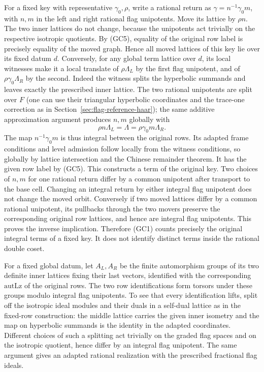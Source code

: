 For a fixed key with representative \(\gamma_0,\rho\), write a
rational return as \(\gamma=n^{-1}\gamma_0m\), with \(n,m\) in
the left and right rational flag unipotents. Move its lattice
by \(\rho n\). The two inner lattices do not change, because
the unipotents act trivially on the respective isotropic
quotients. By (GC5), equality of the original row label is
precisely equality of the moved graph. Hence all moved
lattices of this key lie over its fixed datum \(d\).
Conversely, for any global term lattice over \(d\), its local
witnesses make it a local translate of \(\rho\Lambda_L\) by
the first flag unipotent, and of
\(\rho\gamma_0\Lambda_R\) by the second. Indeed the witness
splits the hyperbolic summands and leaves exactly the
prescribed inner lattice. The two rational unipotents are
split over \(F\) (one can use their triangular hyperbolic
coordinates and the trace-one correction as in
Section~\ref{sec:flag-reference-haar}); the same additive
approximation argument produces \(n,m\) globally with
\[
       \rho n\Lambda_L=\Lambda=\rho\gamma_0m\Lambda_R.
\]
The map \(n^{-1}\gamma_0m\) is thus integral between the original
rows. Its adapted frame conditions and level admission follow
locally from the witness conditions, so globally by lattice
intersection and the Chinese remainder theorem. It has the
given row label by (GC5). This constructs a term of the
original key. Two choices of \(n,m\) for one rational return
differ by a common unipotent after transport to the base cell.
Changing an integral return by either integral flag unipotent
does not change the moved orbit. Conversely if two moved
lattices differ by a common rational unipotent, its pullbacks
through the two movers preserve the corresponding original
row lattices, and hence are integral flag unipotents. This
proves the inverse implication. Therefore (GC1) counts
precisely the original integral terms of a fixed key. It
does not identify distinct terms inside the rational double
coset.

For a fixed global datum, let \(A_L,A_R\) be the finite
automorphism groups of its two definite inner lattices fixing
their last vectors, identified with the corresponding
\(\mathrm{autLz}\) of the original rows. The two row
identifications form torsors under these groups modulo
integral flag unipotents. To see that every identification
lifts, split off the isotropic ideal modules and their duals
in a self-dual lattice as in the fixed-row construction:
the middle lattice carries the given inner isometry and the
map on hyperbolic summands is the identity in the adapted
coordinates. Different choices of such a splitting act
trivially on the graded flag spaces and on the isotropic
quotient, hence differ by an integral flag unipotent.
The same argument gives an adapted rational realization
with the prescribed fractional flag ideals.

